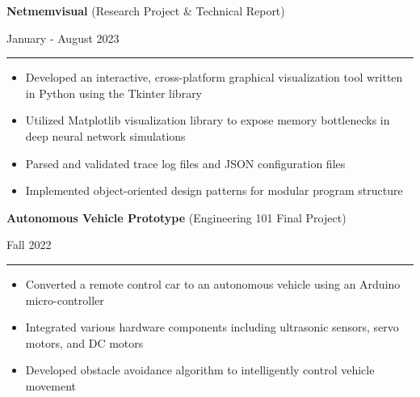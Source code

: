 \documentclass[letter]{article}
\begin{document}
    \noindent
    \begin{minipage}[c]{0.8\linewidth}
        \noindent \textbf{Netmemvisual} (Research Project \& Technical Report)
    \end{minipage}
    \begin{minipage}[c]{0.19\linewidth}
        \begin{flushright}
            January - August 2023
        \end{flushright}
    \end{minipage}
    \vspace{4pt}
    \hrule
    \vspace{4pt}
    \noindent
    \begin{itemize}[noitemsep, topsep=0pt]
        \item Developed an interactive, cross-platform graphical visualization tool written in Python using the Tkinter library
        \item Utilized Matplotlib visualization library to expose memory bottlenecks in deep neural network simulations
        \item Parsed and validated trace log files and JSON configuration files
        \item Implemented object-oriented design patterns for modular program structure
    \end{itemize}
    \medskip

    \noindent
    \begin{minipage}[c]{0.8\linewidth}
        \noindent \textbf{Autonomous Vehicle Prototype} (Engineering 101 Final Project)
    \end{minipage}
    \begin{minipage}[c]{0.19\linewidth}
        \begin{flushright}
            Fall 2022
        \end{flushright}
    \end{minipage}
    \vspace{4pt}
    \hrule
    \vspace{4pt}
    \noindent
    \begin{itemize}[noitemsep, topsep=0pt]
        \item Converted a remote control car to an autonomous vehicle using an Arduino micro-controller
        \item Integrated various hardware components including ultrasonic sensors, servo motors, and DC motors
        \item Developed obstacle avoidance algorithm to intelligently control vehicle movement
    \end{itemize}
    \medskip
\end{document}
